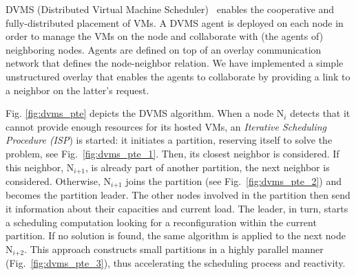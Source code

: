 DVMS (Distributed Virtual Machine Scheduler)~\cite{quesnel:cpe2012} enables the
cooperative and fully-distributed placement of
VMs. A DVMS agent is deployed on each node in order to manage the VMs on
the node and collaborate with (the agents of) neighboring nodes.
Agents are defined on top of an overlay communication network that
defines the node-neighbor relation.
We have implemented a simple %
unstructured overlay that enables the agents to collaborate
by providing a link to a neighbor %
on the latter's request.





Fig. \ref{fig:dvms_pte} depicts the DVMS algorithm.
When a node N\(_{\textit{i}}\) detects that it cannot provide enough
resources for its hosted VMs, %
an \emph{Iterative Scheduling Procedure
  (ISP}) is started:
%
it initiates a partition, reserving itself to solve the problem, see
Fig.~\ref{fig:dvms_pte_1}.  Then, its closest
neighbor %
is considered.
%
%
%
If this neighbor, N\(_{\textit{i+1}}\),
is already part of another partition, the next neighbor is considered.
Otherwise, N\(_{\textit{i+1}}\)
joins the partition (see Fig.~\ref{fig:dvms_pte_2}) and becomes the
partition leader.
%
The other nodes involved in the partition then send it information about their
capacities and current load. The leader, in turn, starts a scheduling
computation looking for a reconfiguration within the current
partition. If no solution is found, the same algorithm is applied to
the next node N\(_{\textit{i+2}}\).
%
This approach constructs small partitions in a highly parallel manner
(Fig.~\ref{fig:dvms_pte_3}), thus accelerating the scheduling process
and reactivity.


